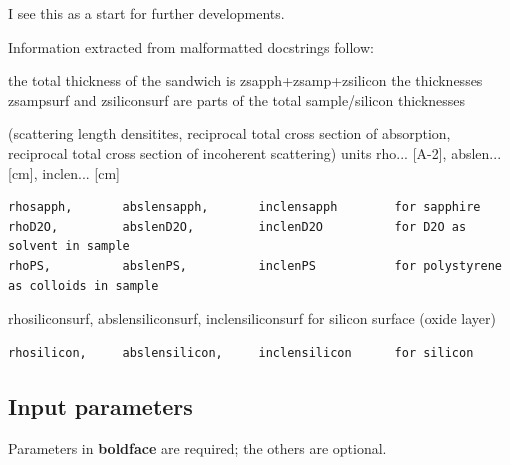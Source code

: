I see this as a start for further developments.

Information extracted from malformatted docstrings follow:

the total thickness of the sandwich is zsapph+zsamp+zsilicon the thicknesses zsampsurf and zsiliconsurf are parts of the total sample/silicon thicknesses

(scattering length densitites, reciprocal total cross section of absorption, reciprocal total cross section of incoherent scattering) units rho... [A-2], abslen... [cm], inclen... [cm]

\begin{verbatim}
rhosapph,       abslensapph,       inclensapph        for sapphire
rhoD2O,         abslenD2O,         inclenD2O          for D2O as solvent in sample
rhoPS,          abslenPS,          inclenPS           for polystyrene as colloids in sample
\end{verbatim}

rhosiliconsurf, abslensiliconsurf, inclensiliconsurf for silicon surface (oxide layer)

\begin{verbatim}
rhosilicon,     abslensilicon,     inclensilicon      for silicon
\end{verbatim}

\subsection*{Input parameters}
Parameters in \textbf{boldface} are required; the others are optional.

